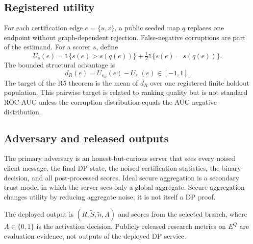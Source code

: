 \subsection{Registered utility}

For each certification edge $e=\{u,v\}$, a public seeded map $q$ replaces one
endpoint without graph-dependent rejection. False-negative corruptions are
part of the estimand. For a scorer $s$, define
\begin{equation}
 U_s(e)=\mathbb{1}\{s(e)>s(q(e))\}
 +\tfrac12\mathbb{1}\{s(e)=s(q(e))\}.
\end{equation}
The bounded structural advantage is
\begin{equation}
 d_R(e)=U_{s_R}(e)-U_{s_0}(e)\in[-1,1].
\end{equation}
The target of the R5 theorem is the mean of $d_R$ over one registered finite
holdout population. This pairwise target is related to ranking quality but is
not standard ROC-AUC unless the corruption distribution equals the AUC
negative distribution.

\subsection{Adversary and released outputs}

The primary adversary is an honest-but-curious server that sees every noised
client message, the final DP state, the noised certification statistics, the
binary decision, and all post-processed scores. Ideal secure aggregation is a
secondary trust model in which the server sees only a global aggregate.
Secure aggregation changes utility by reducing aggregate noise; it is not
itself a DP proof.

The deployed output is $(R,\widetilde S,\widetilde n,A)$ and scores from the
selected branch, where $A\in\{0,1\}$ is the activation decision. Publicly
released research metrics on $E^Q$ are evaluation evidence, not outputs of the
deployed DP service.
